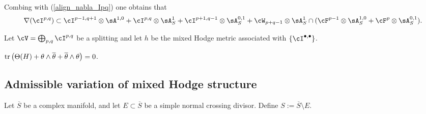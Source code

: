\documentclass[11pt,letterpaper]{amsart}
\numberwithin{equation}{section}
\begin{document}
	Combing with (\ref{align_nabla_Ipq}) one obtains that
	\begin{align}
		\nabla(\cI^{p,q})\subset\cI^{p-1,q+1}\otimes\sA^{1,0}+\cI^{p,q}\otimes\sA^1_S+\cI^{p+1,q-1}\otimes\sA^{0,1}_S+\cW_{p+q-1}\otimes\sA^1_S\cap(\cF^{p-1}\otimes\sA^{1,0}_S+\cF^p\otimes\sA^{0,1}_S).
	\end{align}
	\begin{prop}
		Let $\cV=\bigoplus_{p,q}\cI^{p,q}$ be a splitting and let $h$ be the mixed Hodge metric associated with $\{\cI^{\bullet,\bullet}\}$.
	\end{prop}
	
	\begin{cor}\label{cor_curvature_formula_trace}
		${\rm tr}\left(\Theta(H)+\theta\wedge\overline{\theta}+\overline{\theta}\wedge\theta\right)=0$.
	\end{cor}
	\fi
	\subsection{Admissible variation of mixed Hodge structure}
	Let $\overline{S}$ be a complex manifold, and let $E \subset \overline{S}$ be a simple normal crossing divisor. Define $S := \overline{S} \setminus E$. 
	
\end{document}
